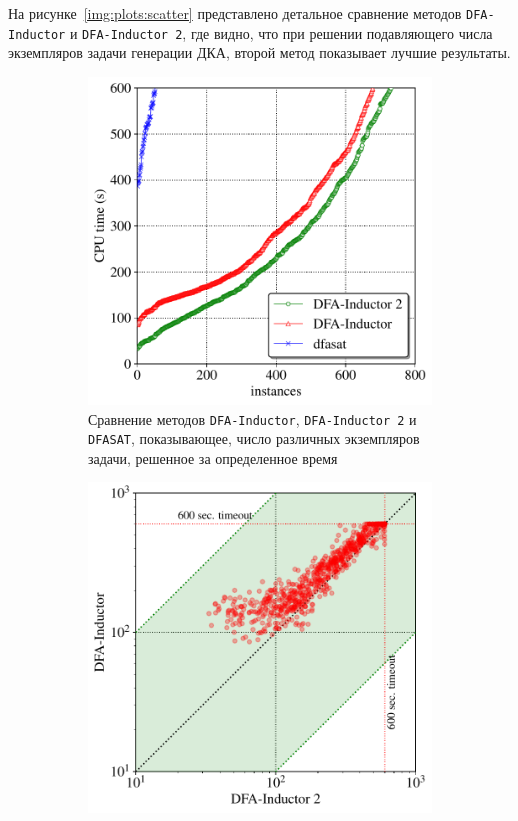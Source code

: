 На рисунке~\ref{img:plots:scatter} представлено детальное сравнение методов \texttt{DFA-Inductor} и \texttt{DFA-Inductor~2}, где видно, что при решении подавляющего числа экземпляров задачи генерации ДКА, второй метод показывает лучшие результаты.

\begin{figure}[ht]
  \centering
  \begin{subfigure}[b]{0.48\textwidth}
    \centering
    \includegraphics[width=\textwidth]{img/lata19/plots/cactus}
    \caption{Сравнение методов \texttt{DFA-Inductor}, \texttt{DFA-Inductor~2} и \texttt{DFASAT}, показывающее, число различных экземпляров задачи, решенное за определенное время}
    \label{img:plots:cactus}
  \end{subfigure}%
  \;\;
  \begin{subfigure}[b]{0.48\textwidth}
    \centering
    \includegraphics[width=\textwidth]{img/lata19/plots/scatter}

\end{subfigure}
\end{figure}

